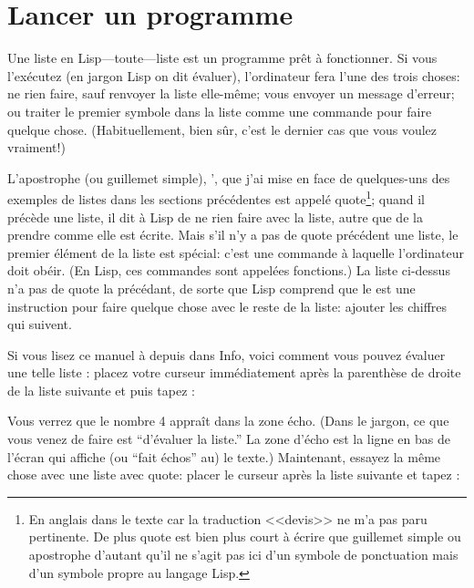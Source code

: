 \section{Lancer un programme}

Une liste en Lisp---toute---liste est un programme prêt à
fonctionner. Si vous l'exécutez (en jargon Lisp on dit évaluer),
l'ordinateur fera l'une des trois choses: ne rien faire, sauf renvoyer
la liste elle-même; vous envoyer un message d'erreur; ou traiter le
premier symbole dans la liste comme une commande pour faire quelque
chose. (Habituellement, bien sûr, c'est le dernier cas que vous voulez
vraiment!) 

L'apostrophe (ou guillemet simple), ', que j'ai mise en face de quelques-uns des
exemples de listes dans les sections précédentes est appelé
quote\footnote{En anglais dans le texte car la traduction <<devis>> ne
  m'a pas paru pertinente. De plus quote est bien plus court à écrire
  que guillemet simple ou apostrophe d'autant qu'il ne s'agit pas ici
  d'un symbole de ponctuation mais d'un symbole propre au langage
  Lisp.}; quand il précède une liste, il dit à Lisp 
de ne rien faire avec la liste, autre que de la prendre comme elle est
écrite. Mais s'il n'y a pas de quote précédent une liste, le premier
élément de la liste est spécial: c'est une commande à laquelle
l'ordinateur doit obéir. (En Lisp, ces commandes sont appelées
fonctions.) La liste  ci-dessus n'a pas de quote la
précédant, de sorte que Lisp comprend que le \tm{+} est une
instruction pour faire quelque chose avec le reste de la liste:
ajouter les chiffres qui suivent. 

Si vous lisez ce manuel à depuis \gem dans Info, voici comment
vous pouvez évaluer une telle liste : placez votre curseur
immédiatement après la parenthèse de droite de la liste suivante et
puis tapez :
\begin{center}
\end{center}

Vous verrez que le nombre 4 appraît dans la zone écho. (Dans le jargon, ce
que vous venez de faire est ``d'évaluer la liste.'' La zone d'écho est
la ligne en bas de l'écran qui affiche (ou ``fait échos'' au) le texte.)
Maintenant, essayez la même chose avec une liste avec quote: placer le
curseur après la liste suivante et tapez :
\begin{center}
\end{center}

